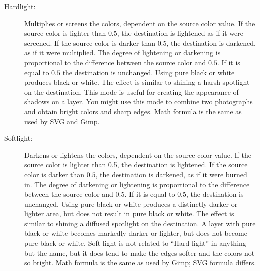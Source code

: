 \begin{description}
    \item[Hardlight:] Multiplies or screens the colors, dependent on the source color value.  If the source color is lighter than $0.5$, the destination is lightened as if it were screened.  If the source color is darker than $0.5$, the destination is darkened, as if it were multiplied.  The degree of lightening or darkening is proportional to the difference between the source color and $0.5$.  If it is equal to $0.5$ the destination is unchanged.  Using pure black or white produces black or white.  The effect is similar to shining a harsh spotlight on the destination.  This mode is useful for creating the appearance of shadows on a layer.  You might use this mode to combine two photographs and obtain bright colors and sharp edges.  Math formula is the same as used by SVG and Gimp.
    \item[Softlight:] Darkens or lightens the colors, dependent on the source color value.  If the source color is lighter than 0.5, the destination is lightened. If the source color is darker than $0.5$, the destination is darkened, as if it were burned in.  The degree of darkening or lightening is proportional to the difference between the source color and $0.5$.  If it is equal to $0.5$, the destination is unchanged.  Using pure black or white produces a distinctly darker or lighter area, but does not result in pure black or white.  The effect is similar to shining a diffused spotlight on the destination.  A layer with pure black or white becomes markedly darker or lighter, but does not become pure black or white.  Soft light is not related to “Hard light” in anything but the name, but it does tend to make the edges softer and the colors not so bright.   Math formula is the same as used by Gimp; SVG formula differs.
\end{description}

